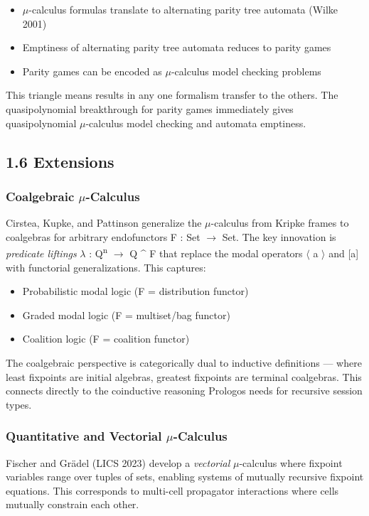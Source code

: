 \documentclass[11pt]{article}
\begin{document}
\begin{itemize}
\item \(\mu\)-calculus formulas translate to alternating parity tree automata (Wilke 2001)
\item Emptiness of alternating parity tree automata reduces to parity games
\item Parity games can be encoded as \(\mu\)-calculus model checking problems
\end{itemize}

This triangle means results in any one formalism transfer to the others. The
quasipolynomial breakthrough for parity games immediately gives
quasipolynomial \(\mu\)-calculus model checking and automata emptiness.
\subsection{1.6 Extensions}
\label{sec:orge6b1bb3}

\subsubsection{Coalgebraic \(\mu\)-Calculus}
\label{sec:org498ae5f}

Cirstea, Kupke, and Pattinson generalize the \(\mu\)-calculus from Kripke frames to
coalgebras for arbitrary endofunctors F : Set \(\to\) Set. The key innovation is
\emph{predicate liftings} \(\lambda\) : Q\textsuperscript{n} \(\to\) Q \^{} F that replace the modal operators
\(\langle\) a \(\rangle\) and [a] with functorial generalizations. This captures:
\begin{itemize}
\item Probabilistic modal logic (F = distribution functor)
\item Graded modal logic (F = multiset/bag functor)
\item Coalition logic (F = coalition functor)
\end{itemize}

The coalgebraic perspective is categorically dual to inductive definitions ---
where least fixpoints are initial algebras, greatest fixpoints are terminal
coalgebras. This connects directly to the coinductive reasoning Prologos needs
for recursive session types.
\subsubsection{Quantitative and Vectorial \(\mu\)-Calculus}
\label{sec:org141d43f}

Fischer and Grädel (LICS 2023) develop a \emph{vectorial} \(\mu\)-calculus where fixpoint
variables range over tuples of sets, enabling systems of mutually recursive
fixpoint equations. This corresponds to multi-cell propagator interactions
where cells mutually constrain each other.
\end{document}
